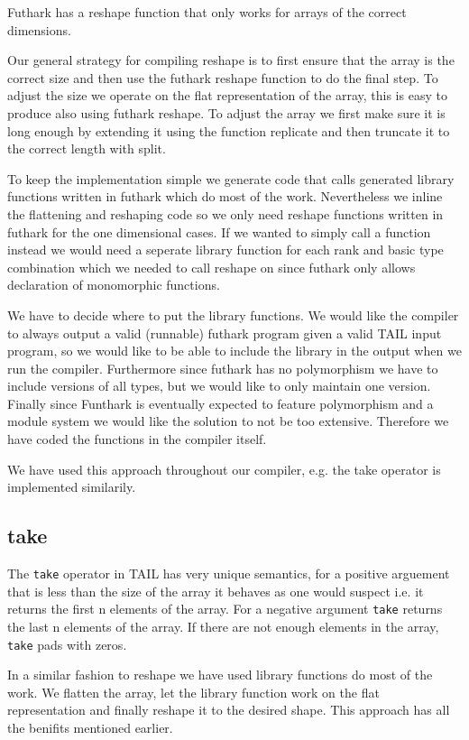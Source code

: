 \documentclass[11pt]{article}
\begin{document}
Futhark has a reshape function that only works for arrays of the correct dimensions.

Our general strategy for compiling reshape is to first ensure that the array is the correct size and then use the futhark reshape
function to do the final step. To adjust the size we operate on the flat representation of the array, this is easy to produce also
using futhark reshape. To adjust the array we first make sure it is long enough by extending it using the function replicate and then
truncate it to the correct length with split.

To keep the implementation simple we generate code that calls generated library functions written in futhark which do most of the work.
Nevertheless we inline the flattening and reshaping code so we only need reshape functions written in futhark
for the one dimensional cases. If we wanted to simply call a function instead we would need a seperate library function for each
rank and basic type combination which we needed to call reshape on since futhark only allows declaration of monomorphic functions.

We have to decide where to put the library functions.
We would like the compiler to always output a valid (runnable) futhark program given a valid TAIL input program, so we would like to
be able to include the library in the output when we run the compiler.
Furthermore since futhark has no polymorphism we have to include versions of all types, but we would like to only maintain one version.
Finally since Funthark is eventually expected to feature polymorphism and a module system we would like the solution to not be too
extensive. Therefore we have coded the functions in the compiler itself.

We have used this approach throughout our compiler, e.g. the take operator is implemented similarily.
\subsection{take} 

The {\tt take} operator in TAIL has very unique semantics, for a positive arguement that is less than the size of the array it behaves as one would suspect i.e. it returns the first n elements of the array. For a negative argument {\tt take} returns the last n elements of the array. If there are not enough elements in the array, {\tt take} pads with zeros.

In a similar fashion to reshape we have used library functions do most of the work.
We flatten the array, let the library function work on the flat representation and finally reshape it to the desired shape.
This approach has all the benifits mentioned earlier.
\end{document}
